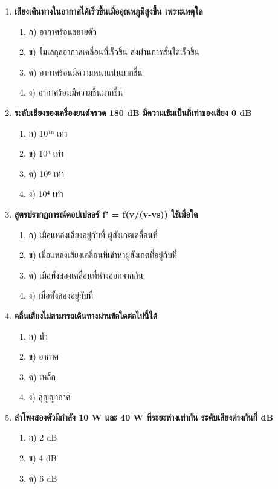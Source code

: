 \documentclass[12pt]{article}
\begin{document}
\begin{enumerate}
\begin{enumerate}
\item ข) เสียง A มาตรฐาน
\item ค) เสียง C กลาง
\item ง) เสียง D มาตรฐาน
\end{enumerate}
\item \textbf{เสียงเดินทางในอากาศได้เร็วขึ้นเมื่ออุณหภูมิสูงขึ้น เพราะเหตุใด}
\begin{enumerate}
\item ก) อากาศร้อนขยายตัว
\item ข) โมเลกุลอากาศเคลื่อนที่เร็วขึ้น ส่งผ่านการสั่นได้เร็วขึ้น
\item ค) อากาศร้อนมีความหนาแน่นมากขึ้น
\item ง) อากาศร้อนมีความชื้นมากขึ้น
\end{enumerate}
\item \textbf{ระดับเสียงของเครื่องยนต์จรวด 180 dB มีความเข้มเป็นกี่เท่าของเสียง 0 dB}
\begin{enumerate}
\item ก) 10¹⁸ เท่า
\item ข) 10⁸ เท่า
\item ค) 10⁶ เท่า
\item ง) 10⁴ เท่า
\end{enumerate}
\item \textbf{สูตรปรากฏการณ์ดอปเปลอร์ f' = f(v/(v-vs)) ใช้เมื่อใด}
\begin{enumerate}
\item ก) เมื่อแหล่งเสียงอยู่กับที่ ผู้สังเกตเคลื่อนที่
\item ข) เมื่อแหล่งเสียงเคลื่อนที่เข้าหาผู้สังเกตที่อยู่กับที่
\item ค) เมื่อทั้งสองเคลื่อนที่ห่างออกจากกัน
\item ง) เมื่อทั้งสองอยู่กับที่
\end{enumerate}
\item \textbf{คลื่นเสียงไม่สามารถเดินทางผ่านข้อใดต่อไปนี้ได้}
\begin{enumerate}
\item ก) น้ำ
\item ข) อากาศ
\item ค) เหล็ก
\item ง) สุญญากาศ
\end{enumerate}
\item \textbf{ลำโพงสองตัวมีกำลัง 10 W และ 40 W ที่ระยะห่างเท่ากัน ระดับเสียงต่างกันกี่ dB}
\begin{enumerate}
\item ก) 2 dB
\item ข) 4 dB
\item ค) 6 dB

\end{enumerate}
\end{enumerate}
\end{document}
